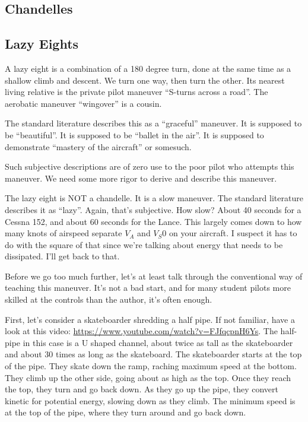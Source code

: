 \subsection{Chandelles}

\subsection{Lazy Eights}

A lazy eight is a combination of a 180 degree turn, done at the same time as a shallow climb and descent. We turn one way, then turn the other. Its nearest living relative is the private pilot maneuver ``S-turns across a road''. The aerobatic maneuver ``wingover'' is a cousin.

The standard literature describes this as a ``graceful'' maneuver. It is supposed to be ``beautiful''. It is supposed to be ``ballet in the air''. It is supposed to demonstrate ``mastery of the aircraft'' or somesuch.

Such subjective descriptions are of zero use to the poor pilot who attempts this maneuver. We need some more rigor to derive and describe this maneuver.

The lazy eight is NOT a chandelle. It is a slow maneuver. The standard literature describes it as ``lazy''. Again, that's subjective. How slow? About 40 seconds for a Cessna 152, and about 60 seconds for the Lance. This largely comes down to how many knots of airspeed separate $V_A$ and $V_S0$ on your aircraft. I suspect it has to do with the square of that since we're talking about energy that needs to be dissipated. I'll get back to that.

Before we go too much further, let's at least talk through the conventional way of teaching this maneuver. It's not a bad start, and for many student pilots more skilled at the controls than the author, it's often enough.

First, let's consider a skateboarder shredding a half pipe. If not familiar, have a look at this video: \url{https://www.youtube.com/watch?v=FJfqcpnH6Ys}. The half-pipe in this case is a U shaped channel, about twice as tall as the skateboarder and about 30 times as long as the skateboard. The skateboarder starts at the top of the pipe. They skate down the ramp, raching maximum speed at the bottom. They climb up the other side, going about as high as the top. Once they reach the top, they turn and go back down. As they go up the pipe, they convert kinetic for potential energy, slowing down as they climb. The minimum speed is at the top of the pipe, where they turn around and go back down.

